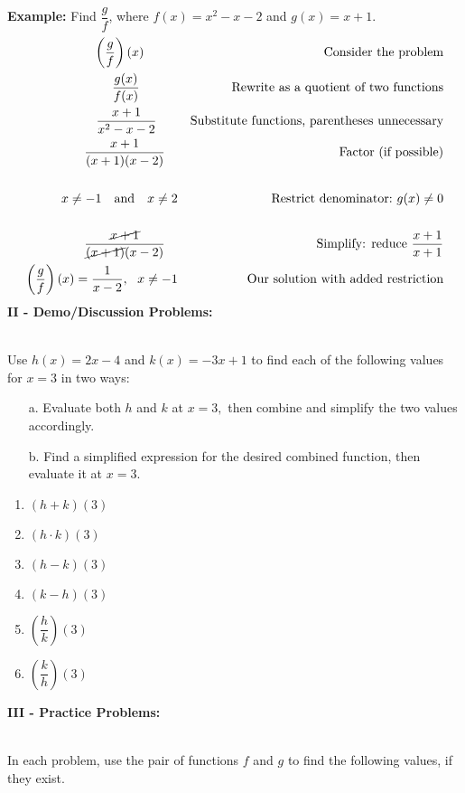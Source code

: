\documentclass[12pt]{article}
\theoremstyle{definition}
\begin{document}
{\bf Example:} Find $\dfrac{g}{f}$, where $f(x) = x^2 - x - 2$ and $g(x) = x + 1$.
 \begin{eqnarray*}
    \left(\dfrac{g}{f}\right)(x)~~~~~~~~ &  & \text{Consider the problem} \\
		\dfrac{g(x)}{f(x)}~~~~~~~~~ &  & \text{Rewrite as a quotient of two functions}\\
    \dfrac{x + 1}{x^2 - x - 2}~~~~~  &  & \text{Substitute functions, parentheses unnecessary}\\
  	 \dfrac{x+1}{(x+1)(x-2)}~~~&  & \text{Factor (if possible)}\\
  & & \\ 
		x \neq -1 ~~\text{~and~}~~ x \neq 2 &  & \text{Restrict denominator:} \ g(x)\neq 0\\
  & & \\ 
	\dfrac{\cancel{x + 1}}{\cancel{(x+1)}(x-2)}~~~  & & \text{Simplify: reduce $\dfrac{x+1}{x+1}$}\\
	\left(\dfrac{g}{f}\right)(x)=\dfrac{1}{x-2}, ~~ x \neq -1  & & \text{Our solution with added restriction}
	\end{eqnarray*}
\newpage
{\bf II - Demo/Discussion Problems:}\\
\ \par
Use $h (x) = 2 x - 4$ and $k (x) = - 3 x + 1$ to find each of the following values for $x=3$ in two ways:
\begin{enumerate}
	\item[a.] Evaluate both $h$ and $k$ at $x=3,$ then combine and simplify the two values accordingly.
	\item[b.] Find a simplified expression for the desired combined function, then evaluate it at $x=3$.
\end{enumerate}
\begin{multicols}{3}
\begin{enumerate}
		\item $(h+k)(3)$
		\item $(h\cdot k)(3)$\\
		\item $(h-k)(3)$
		\item $(k-h)(3)$\\
		\item $\left(\dfrac{h}{k}\right)(3)$
		\item $\left(\dfrac{k}{h}\right)(3)$
\end{enumerate}
\end{multicols}
	{\bf III - Practice Problems:}\\
\ \par
In each problem, use the pair of functions $f$ and $g$ to find the following values, if they exist.
\end{document}
